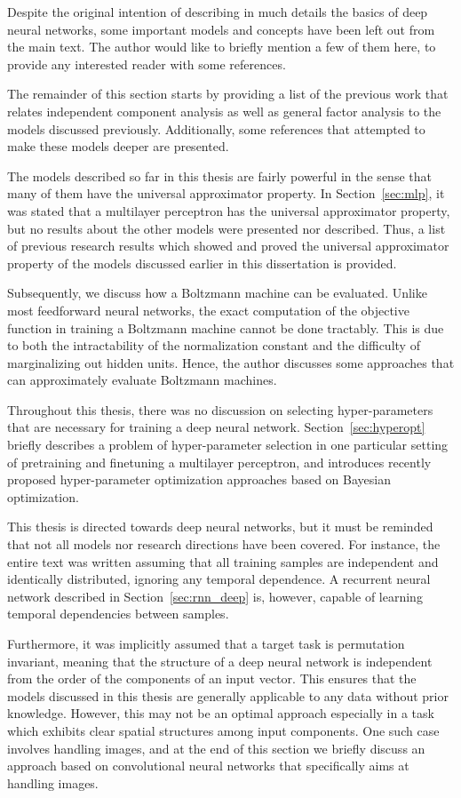 \documentclass[dissertation,nocontribution]{aaltoseries}
\begin{document}
Despite the original intention of describing in much
details the basics of deep neural networks,
some important models and concepts have been left out from
the main text. The author would like to briefly mention
a few of them here, to provide any interested reader with
some references.

The remainder of this section starts by providing a list of
the previous work that relates independent component
analysis as well as general factor analysis to the models
discussed previously.  Additionally, some references that
attempted to make these models deeper are presented.  

The models described so far in this thesis are fairly
powerful in the sense that many of them have the universal
approximator property. In Section~\ref{sec:mlp}, it was
stated that a multilayer perceptron has the universal
approximator property, but no results about the other models
were presented nor described. Thus, a list of previous
research results which showed and proved the universal approximator
property of the models discussed earlier in this
dissertation is provided.

Subsequently, we discuss how a Boltzmann machine can be
evaluated. Unlike most feedforward neural
networks, the exact computation of the objective function in
training a Boltzmann machine cannot be done tractably. This
is due to both the intractability of the normalization
constant and the difficulty of marginalizing out hidden
units. Hence, the author discusses some approaches that can
approximately evaluate Boltzmann machines.

Throughout this thesis, there was no discussion on selecting
hyper-parameters that are necessary for training a deep
neural network. Section~\ref{sec:hyperopt} briefly describes
a problem of hyper-parameter selection in one particular
setting of pretraining and finetuning a multilayer
perceptron, and introduces recently proposed
hyper-parameter optimization approaches based on Bayesian
optimization.

This thesis is directed towards deep neural networks, but it must
be reminded that not all models nor research directions have been
covered. For instance, the entire text was written assuming that
all training samples are independent and identically distributed,
ignoring any temporal dependence.  A recurrent neural network
described in Section~\ref{sec:rnn_deep} is, however, capable
of learning temporal dependencies between samples.

Furthermore, it was implicitly assumed that a target task is
permutation invariant, meaning that the structure of a deep
neural network is independent from the order of the
components of an input vector. This ensures that the models
discussed in this thesis are generally applicable to any
data without prior knowledge. However, this may not be an
optimal approach especially in a task which exhibits clear
spatial structures among input components. One such case
involves handling images, and at the end of this section we
briefly discuss an approach based on convolutional neural
networks that specifically aims at handling images.
\end{document}
